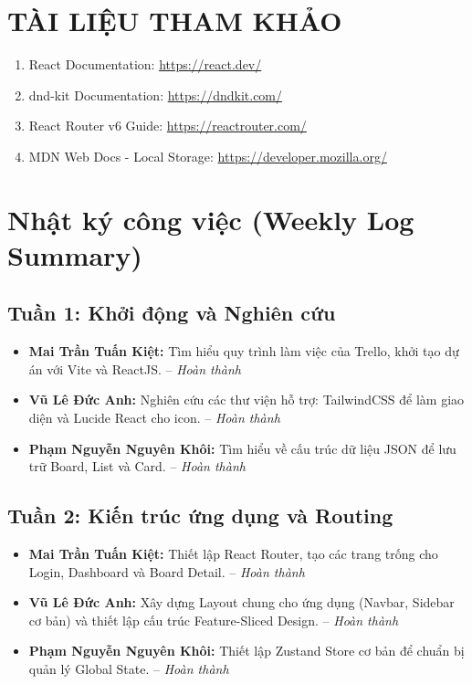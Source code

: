 \chapter*{TÀI LIỆU THAM KHẢO}

\begin{enumerate}
    \item React Documentation: \url{https://react.dev/}
    \item dnd-kit Documentation: \url{https://dndkit.com/}
    \item React Router v6 Guide: \url{https://reactrouter.com/}
    \item MDN Web Docs - Local Storage: \url{https://developer.mozilla.org/}
\end{enumerate}

\appendix

\chapter{Nhật ký công việc (Weekly Log Summary)}

\section*{Tuần 1: Khởi động và Nghiên cứu}
\begin{itemize}
    \item \textbf{Mai Trần Tuấn Kiệt:} Tìm hiểu quy trình làm việc của Trello, khởi tạo dự án với Vite và ReactJS. -- \textit{Hoàn thành}
    \item \textbf{Vũ Lê Đức Anh:} Nghiên cứu các thư viện hỗ trợ: TailwindCSS để làm giao diện và Lucide React cho icon. -- \textit{Hoàn thành}
    \item \textbf{Phạm Nguyễn Nguyên Khôi:} Tìm hiểu về cấu trúc dữ liệu JSON để lưu trữ Board, List và Card. -- \textit{Hoàn thành}
\end{itemize}

\section*{Tuần 2: Kiến trúc ứng dụng và Routing}
\begin{itemize}
    \item \textbf{Mai Trần Tuấn Kiệt:} Thiết lập React Router, tạo các trang trống cho Login, Dashboard và Board Detail. -- \textit{Hoàn thành}
    \item \textbf{Vũ Lê Đức Anh:} Xây dựng Layout chung cho ứng dụng (Navbar, Sidebar cơ bản) và thiết lập cấu trúc Feature-Sliced Design. -- \textit{Hoàn thành}
    \item \textbf{Phạm Nguyễn Nguyên Khôi:} Thiết lập Zustand Store cơ bản để chuẩn bị quản lý Global State. -- \textit{Hoàn thành}
\end{itemize}


